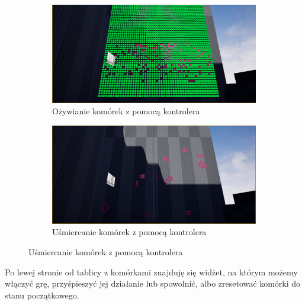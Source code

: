 \documentclass[a4paper,12pt,reqno]{article}
\begin{document}
\begin{figure}[!ht]%
	\centering
	\begin{subfigure}{.5\textwidth}
		\centering
		\includegraphics[width=0.9\linewidth]{graphics/gameoflife/GOLInUE_1.png}
		\caption{Ożywianie komórek z pomocą kontrolera}	
		\label{ref:subref_a}
	\end{subfigure}%
	\begin{subfigure}{.5\textwidth}
		\centering
		\includegraphics[width=0.9\linewidth]{graphics/gameoflife/GOLInUE_2.png}
		\caption{Uśmiercanie komórek z pomocą kontrolera}
		\label{ref:subref_b}
	\end{subfigure}%
\label{ref:ref}
\end{figure}

Po lewej stronie od tablicy z komórkami znajduję się widżet, na którym możemy włączyć grę, przyśpieszyć jej działanie lub spowolnić, albo zresetować komórki do stanu początkowego. 
\end{document}
